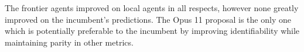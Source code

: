 \documentclass[11pt]{article}
\begin{document}

The frontier agents improved on local agents in all respects, however none greatly improved on the incumbent's predictions. The Opus 11 proposal is the only one which is potentially preferable to the incumbent by improving identifiability while maintaining parity in other metrics.
\end{document}
